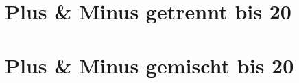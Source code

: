 \documentclass[version=last,paper=A4,fontsize=14pt,DIV=18]{scrartcl}
\begin{document}
	\section*{Plus \& Minus getrennt bis 20}
	
	
	
	
	\pagebreak
	
	\section*{Plus \& Minus gemischt bis 20}

	
	
\end{document}
